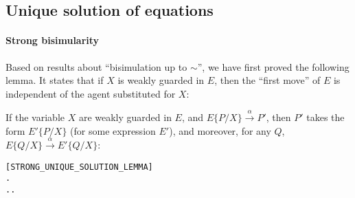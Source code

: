 
\subsection{Unique solution of equations}
\label{ss:part2}

\paragraph{Strong bisimularity}
Based on results about ``bisimulation up to $\sim$'', we have first proved the following
 lemma. It states  that if $X$ is weakly guarded
in $E$, then the ``first move'' of $E$ is independent of the agent
substituted for $X$:
\begin{lemma}
\label{lem:313}
If the variable $X$ are weakly guarded in $E$, and
$E\{P/X\}\overset{\alpha}{\rightarrow} P'$, then $P'$ takes the form
$E'\{P/X\}$ (for some expression $E'$), and moreover, for any $Q$,
$E\{Q/X\}\overset{\alpha}{\rightarrow} E'\{Q/X\}$:
\begin{alltt}
\hfill{[STRONG_UNIQUE_SOLUTION_LEMMA]}
\HOLTokenTurnstile{}   \HOLSymConst{\HOLTokenImp{}}
   \HOLSymConst{\HOLTokenForall{}}  .
         \HOLTokenTransBegin{}\HOLTokenTransEnd {} \HOLSymConst{\HOLTokenImp{}}
       \HOLSymConst{\HOLTokenExists{}}.   \HOLSymConst{\HOLTokenConj{}}  \HOLSymConst{=}   \HOLSymConst{\HOLTokenConj{}} \HOLSymConst{\HOLTokenForall{}}.   \HOLTokenTransBegin{}\HOLTokenTransEnd {} 
\end{alltt}
\end{lemma}

